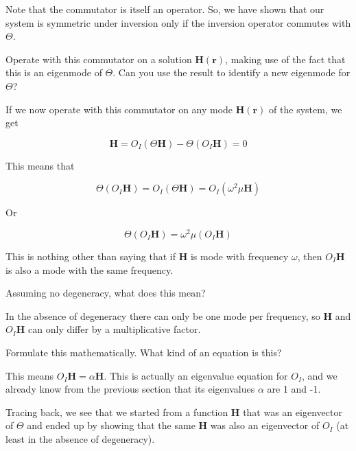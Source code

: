 Note that the commutator is itself an operator. So, we have shown that our system is symmetric under inversion only if the inversion operator commutes with $\Theta$.

\pagebreak

\begin{cue}
Operate with this commutator on a solution ${\mathbf H({\mathbf r})}$, making use of the fact that this is an eigenmode of $\Theta$. Can you use the result to identify a new eigenmode for $\Theta$? 
\end{cue}

If we now operate with this commutator on any mode ${\mathbf H({\mathbf r})}$ of the system, we get

\begin{equation}
[O_I, \Theta] {\mathbf H}= O_I(\Theta {\mathbf H}) - \Theta (O_I {\mathbf H} ) = 0
\end{equation} 

This means that

\begin{equation}
\Theta (O_I {\mathbf H} ) = O_I(\Theta {\mathbf H}) = O_I ( \omega^2 \mu {\mathbf H})
\end{equation} 

Or

\begin{equation}
\Theta (O_I {\mathbf H} ) =  \omega^2 \mu (O_I {\mathbf H})
\end{equation} 

This is nothing other than saying that if ${\mathbf H}$ is mode with frequency $\omega$, then $O_I {\mathbf H}$ is also a mode with the same frequency.

\begin{cue}
Assuming no degeneracy, what does this mean?
\end{cue}

In the absence of degeneracy there can only be one mode per frequency, so ${\mathbf H}$ and $O_I {\mathbf H}$ can only differ by a multiplicative factor.

\begin{cue}
Formulate this mathematically. What kind of an equation is this?
\end{cue}

This means $O_I {\mathbf H} = \alpha {\mathbf H}$. This is actually an eigenvalue equation for $O_I$, and we already know from the previous section that its eigenvalues $\alpha$ are 1 and -1. 

Tracing back, we see that we started from a function ${\mathbf H}$ that was an eigenvector of $\Theta$ and ended up by showing that the same ${\mathbf H}$ was also an eigenvector of $O_I$ (at least in the absence of degeneracy). 

